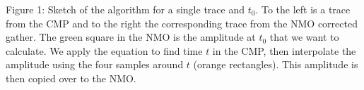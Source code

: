 Figure 1: Sketch of the algorithm for a single trace and $t_0$. To the left
is a trace from the CMP and to the right the corresponding trace from the NMO
corrected gather. The green square in the NMO is the amplitude  at $t_0$ that
we want to calculate. We apply the equation to find time $t$ in the CMP, then
interpolate the amplitude using the four samples around $t$ (orange
rectangles). This amplitude is then copied over to the NMO.
